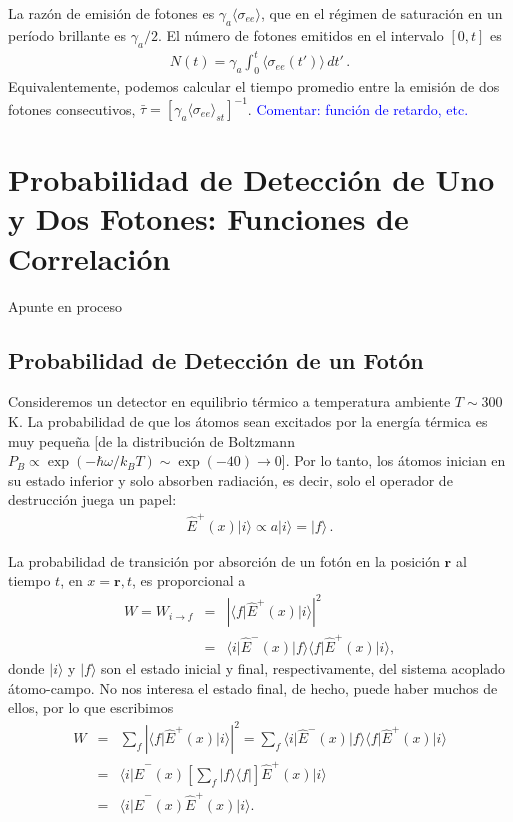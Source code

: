 \documentclass[twocolumn,aps,eqsecnum]{revtex4}
\newcommand{\mbr}{\mathbf{r}}
\providecommand{\vxp}[1]{\langle #1 \rangle}
\providecommand{\bra}[1]{\langle #1 \rvert}
\providecommand{\ket}[1]{\lvert #1 \rangle}
\begin{document}
La raz\'on de emisi\'on de fotones es $\gamma_a \vxp{\sigma_{ee}}$, que 
en el r\'egimen de saturaci\'on en un per\'iodo brillante es $\gamma_a/2$. 
El n\'umero de fotones emitidos en el intervalo $[0,t]$ es 
%
\begin{eqnarray} 
N(t) = \gamma_a \int_0^t \vxp{\sigma_{ee}(t')} \, dt' \,.
\end{eqnarray}
Equivalentemente, podemos calcular el tiempo promedio entre la 
emisi\'on de dos fotones consecutivos, 
$\bar{\tau} = [\gamma_a \vxp{\sigma_{ee}}_{st}]^{-1}$. 
\textcolor{blue}{Comentar: funci\'on de retardo, etc.}


\section{Probabilidad de Detecci\'on de Uno y Dos Fotones: 
Funciones de Correlaci\'on} 
Apunte en proceso
\subsection{Probabilidad de Detecci\'on de un Fot\'on} %
Consideremos un detector en equilibrio t\'ermico a temperatura ambiente 
$T \sim 300$ K. La probabilidad de que los \'atomos sean excitados por la 
energ\'ia t\'ermica es muy peque\~na [de la distribuci\'on de Boltzmann 
$P_B \propto \exp{(-\hbar \omega/k_B T)} \sim \exp{(-40)} \to 0$]. Por lo 
tanto, los \'atomos inician en su estado inferior y solo absorben radiaci\'on, 
es decir, solo el operador de destrucci\'on juega un papel: 
%
\begin{eqnarray} 
 \hat{E}^+ (x) \ket{i} \propto a \ket{i} = \ket{f} \,.
\end{eqnarray}

La probabilidad de transici\'on por absorci\'on de un fot\'on en la posici\'on 
$\mbr$ al tiempo $t$, en $x= \mbr, t$, es proporcional a 
%
\begin{eqnarray} 
W = W_{i \to f} &=& |\bra{f} \hat{E}^+ (x) \ket{i} |^2 	\nonumber \\
    &=& \bra{i} \hat{E}^- (x) \ket{f} \bra{f} \hat{E}^+ (x) \ket{i} ,
 \end{eqnarray}
donde $\ket{i}$ y $\ket{f}$ son el estado inicial y final, respectivamente, 
del sistema acoplado \'atomo-campo. No nos interesa el estado final, de 
hecho, puede haber muchos de ellos, por lo que escribimos  
%
\begin{eqnarray}
W &=& \sum_f |\bra{f} \hat{E}^+ (x) \ket{i} |^2 
  = \sum_f \bra{i} \hat{E}^- (x) \ket{f} \bra{f} \hat{E}^+ (x) \ket{i} \nonumber \\ 
&=& \bra{i} \hat{E}^- (x) \left[ \sum_f \ket{f} \bra{f} \right] 
    \hat{E}^+ (x) \ket{i} 	\nonumber \\ 
    &=& \bra{i} \hat{E}^- (x)  \hat{E}^+ (x) \ket{i} . 
\end{eqnarray}
\end{document}
